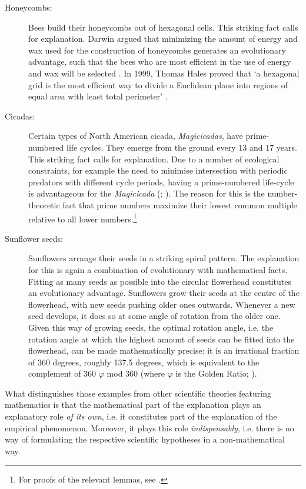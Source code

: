 \documentclass[a4paper,12pt]{article}
\begin{document}
\begin{description}

\item[Honeycombs:] Bees build their honeycombs out of hexagonal cells. This striking fact calls for explanation. Darwin argued that minimizing the amount of energy and wax used for the construction of honeycombs generates an evolutionary advantage, such that the bees who are most efficient in the use of energy and wax will be selected \cite{Darwin1859}. In 1999, Thomas Hales proved that `a hexagonal grid is the most efficient way to divide a Euclidean plane into regions of equal area with least total perimeter' \cite[p.~4]{Hales2001}.

\item[Cicadas:] Certain types of North American cicada, \textit{Magicicadas}, have prime-numbered life cycles. They emerge from the ground every 13 and 17 years. This striking fact calls for explanation. Due to a number of ecological constraints, for example the need to minimise intersection with periodic predators with different cycle periods, having a prime-numbered life-cycle is advantageous for the \textit{Magicicada} (\citealp{Baker2005,Baker2009}; \citealp[p.33]{Goles_etal2001}). The reason for this is the number-theoretic fact that prime numbers maximize their lowest common multiple relative to all lower numbers.\footnote{For proofs of the relevant lemmas, see \cite{Landau1958}.}

\item[Sunflower seeds:] Sunflowers arrange their seeds in a striking spiral pattern. The explanation for this is again a combination of evolutionary with mathematical facts. Fitting as many seeds as possible into the circular flowerhead constitutes an evolutionary advantage. Sunflowers grow their seeds at the centre of the flowerhead, with new seeds pushing older ones outwards. Whenever a new seed develops, it does so at some angle of rotation from the older one. Given this way of growing seeds, the optimal rotation angle, i.e. the rotation angle at which the highest amount of seeds can be fitted into the flowerhead, can be made mathematically precise: it is an irrational fraction of 360 degrees, roughly 137.5 degrees, which is equivalent to the complement of 360 $\varphi$ mod 360 (where $\varphi$ is the Golden Ratio; \citealp[p.~4]{Lyon2012}).

\end{description}


What distinguishes those examples from other scientific theories featuring mathematics is that the mathematical part of the explanation plays an explanatory role \textit{of its own}, i.e. it constitutes part of the explanation of the empirical phenomenon. Moreover, it plays this role \textit{indispensably}, i.e. there is no way of formulating the respective scientific hypotheses in a non-mathematical way.
\end{document}
